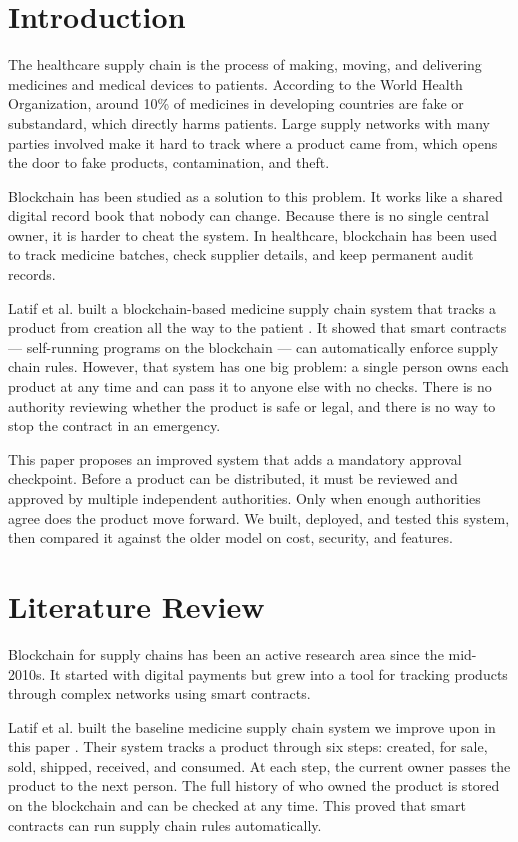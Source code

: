 \documentclass[conference]{IEEEtran}
\begin{document}
\section{Introduction}

The healthcare supply chain is the process of making, moving, and delivering medicines and medical devices to patients. According to the World Health Organization, around 10\% of medicines in developing countries are fake or substandard, which directly harms patients. Large supply networks with many parties involved make it hard to track where a product came from, which opens the door to fake products, contamination, and theft.

Blockchain has been studied as a solution to this problem. It works like a shared digital record book that nobody can change. Because there is no single central owner, it is harder to cheat the system. In healthcare, blockchain has been used to track medicine batches, check supplier details, and keep permanent audit records.

Latif et al. built a blockchain-based medicine supply chain system that tracks a product from creation all the way to the patient \cite{b1}. It showed that smart contracts --- self-running programs on the blockchain --- can automatically enforce supply chain rules. However, that system has one big problem: a single person owns each product at any time and can pass it to anyone else with no checks. There is no authority reviewing whether the product is safe or legal, and there is no way to stop the contract in an emergency.

This paper proposes an improved system that adds a mandatory approval checkpoint. Before a product can be distributed, it must be reviewed and approved by multiple independent authorities. Only when enough authorities agree does the product move forward. We built, deployed, and tested this system, then compared it against the older model on cost, security, and features.

\section{Literature Review}

Blockchain for supply chains has been an active research area since the mid-2010s. It started with digital payments but grew into a tool for tracking products through complex networks using smart contracts.

Latif et al. built the baseline medicine supply chain system we improve upon in this paper \cite{b1}. Their system tracks a product through six steps: created, for sale, sold, shipped, received, and consumed. At each step, the current owner passes the product to the next person. The full history of who owned the product is stored on the blockchain and can be checked at any time. This proved that smart contracts can run supply chain rules automatically.
\end{document}
